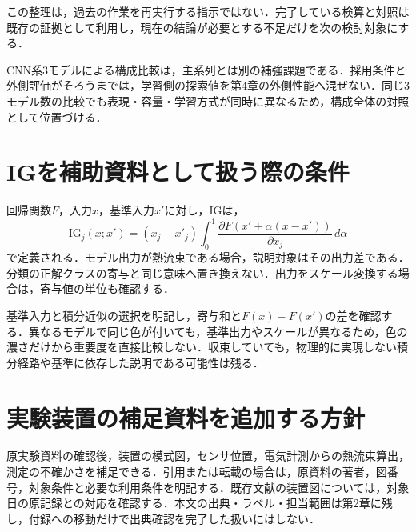 この整理は，過去の作業を再実行する指示ではない．完了している検算と対照は既存の証拠として利用し，現在の結論が必要とする不足だけを次の検討対象にする．

CNN系3モデルによる構成比較は，主系列とは別の補強課題である．採用条件と外側評価がそろうまでは，学習側の探索値を第4章の外側性能へ混ぜない．同じ3モデル数の比較でも表現・容量・学習方式が同時に異なるため，構成全体の対照として位置づける．

\section{IGを補助資料として扱う際の条件}
回帰関数$F$，入力$x$，基準入力$x'$に対し，IGは，
\begin{equation}
 \mathrm{IG}_j(x;x')=(x_j-x'_j)\int_0^1
 \frac{\partial F(x'+\alpha(x-x'))}{\partial x_j}\,d\alpha
\end{equation}
で定義される\cite{sundararajan2017}．モデル出力が熱流束である場合，説明対象はその出力差である．分類の正解クラスの寄与と同じ意味へ置き換えない．出力をスケール変換する場合は，寄与値の単位も確認する．

基準入力と積分近似の選択を明記し，寄与和と$F(x)-F(x')$の差を確認する．異なるモデルで同じ色が付いても，基準出力やスケールが異なるため，色の濃さだけから重要度を直接比較しない．収束していても，物理的に実現しない積分経路や基準に依存した説明である可能性は残る．


\section{実験装置の補足資料を追加する方針}
原実験資料の確認後，装置の模式図，センサ位置，電気計測からの熱流束算出，測定の不確かさを補足できる．引用または転載の場合は，原資料の著者，図番号，対象条件と必要な利用条件を明記する．既存文献の装置図については，対象日の原記録との対応を確認する．本文の出典・ラベル・担当範囲は第2章に残し，付録への移動だけで出典確認を完了した扱いにはしない．
